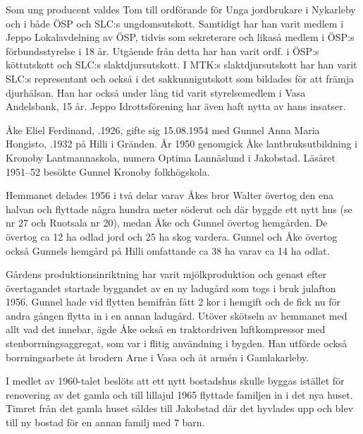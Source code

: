 Som ung producent valdes Tom till ordförande för Unga jordbrukare i Nykarleby och i både ÖSP och SLC:s  ungdomsutskott. Samtidigt har han varit medlem i Jeppo Lokalavdelning av ÖSP, tidvis som sekreterare och likaså medlem i ÖSP:s förbundsstyrelse i 18 år. Utgående från detta har han varit ordf. i ÖSP:s köttutskott och SLC:s slaktdjursutskott. I MTK:s slaktdjursutskott har han varit SLC:s representant och också i det sakkunnigutskott som bildades för att främja djurhälsan. Han har också under lång tid varit styrelsemedlem i Vasa Andelsbank, 15 år. Jeppo Idrottsförening har även haft nytta av hans insatser.


%
Åke Eliel Ferdinand, .1926, gifte sig 15.08.1954 med Gunnel Anna Maria Hongisto, .1932 på Hilli i Gränden. År 1950 genomgick Åke lantbruksutbildning i Kronoby Lantmannaskola, numera Optima Lannäslund i Jakobstad. Läsåret 1951--52 besökte Gunnel Kronoby folkhögskola.

Hemmanet delades 1956 i två delar varav Åkes bror Walter övertog den ena halvan och flyttade några hundra meter söderut och där byggde ett nytt hus (se nr 27 och Ruotsala nr 20), medan Åke och Gunnel övertog hemgården. De övertog ca 12 ha odlad jord och 25 ha skog vardera. Gunnel och Åke övertog också Gunnels hemgård på Hilli omfattande ca 38 ha varav ca 14 ha odlat.

Gårdens produktionsinriktning har varit mjölkproduktion och genast efter övertagandet startade byggandet av en ny ladugård som togs i bruk julafton 1956. Gunnel hade vid flytten hemifrån fått 2 kor i hemgift och de fick nu för andra gången flytta in i en annan ladugård. Utöver skötseln av hemmanet med allt vad det innebar, ägde Åke också en traktordriven luftkompressor med stenborrningsaggregat, som var i flitig användning i bygden. Han utförde också borrningsarbete åt brodern Arne i Vasa och åt armén i Gamlakarleby.

I medlet av 1960-talet beslöts att ett nytt bostadshus skulle byggas istället för renovering av det gamla och till lillajul 1965 flyttade familjen in i det nya huset. Timret från det gamla huset såldes till Jakobstad där det hyvlades upp och blev till ny bostad för en annan familj med 7 barn.


